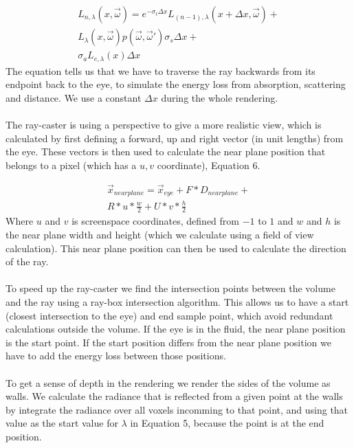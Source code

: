 \begin{equation}
\begin{split}
	L_{n,\lambda}(x,\vec{\omega}) = e^{-\sigma_t\Delta x}L_{(n-1),\lambda}(x+\Delta x,\vec{\omega})+\\
	L_\lambda(x,\vec{\omega})p(\vec{\omega},\vec{\omega}')\sigma_s \Delta x+ \\
	\sigma_a L_{e,\lambda}(x) \Delta x
\end{split}
\end{equation}
The equation tells us that we have to traverse the ray backwards from its endpoint back to the eye, to simulate the energy loss from absorption, scattering and distance. We use a constant $\Delta x$ during the whole rendering. \\\\
The ray-caster is using a perspective to give a more realistic view, which is calculated by first defining a forward, up and right vector (in unit lengths) from the eye. These vectors is then used to calculate the near plane position that belongs to a pixel (which has a $u, v$ coordinate), Equation 6. 

\begin{equation}
\begin{split}
\vec{x}_{nearplane} = \vec{x}_{eye} + F*D_{nearplane} +\\
 R*u*\frac{w}{2} + U*v*\frac{h}{2}
\end{split}
\end{equation}
Where $u$ and $v$ is screenspace coordinates, defined from $-1$ to $1$ and $w$ and $h$ is the near plane width and height (which we calculate using a field of view calculation). This near plane position can then be used to calculate the direction of the ray.  \\\\
To speed up the ray-caster we find the intersection points between the volume and the ray using a ray-box intersection algorithm. This allows us to have a start (closest intersection to the eye) and end sample point, which avoid redundant calculations outside the volume. If the eye is in the fluid, the near plane position is the start point. If the start position differs from the near plane position we have to add the energy loss between those positions. \\\\
To get a sense of depth in the rendering we render the sides of the volume as walls. We calculate the radiance that is reflected from a given point at the walls by integrate the radiance over all voxels incomming to that point, and using that value as the start value for $\lambda$ in Equation 5, because the point is at the end position.
